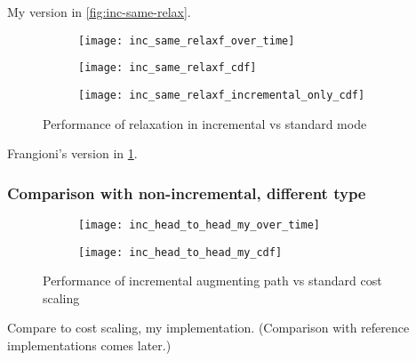 My version in \cref{fig:inc-same-relax}.

\begin{figure}
    \centering
    \begin{subfigure}[c]{0.9\textwidth}
        \texttt{[image: inc\_same\_relaxf\_over\_time]}
    \end{subfigure}
    \begin{subfigure}[c]{0.45\textwidth}
        \texttt{[image: inc\_same\_relaxf\_cdf]}
    \end{subfigure}
    \begin{subfigure}[c]{0.45\textwidth}
        \texttt{[image: inc\_same\_relaxf\_incremental\_only\_cdf]}
    \end{subfigure}
    \caption{Performance of relaxation in incremental vs standard mode}
    \label{fig:inc-same-relaxf}
\end{figure}

Frangioni's version in \cref{fig:inc-same-relaxf}. 

\subsubsection{Comparison with non-incremental, different type}

\begin{figure}
    \centering
    \begin{subfigure}[c]{0.45\textwidth}
        \texttt{[image: inc\_head\_to\_head\_my\_over\_time]}
    \end{subfigure}
    \begin{subfigure}[c]{0.45\textwidth}
        \texttt{[image: inc\_head\_to\_head\_my\_cdf]}
    \end{subfigure}
    \caption{Performance of incremental augmenting path vs standard cost scaling}
    \label{fig:inc-head-to-head-my}
\end{figure}

Compare to cost scaling, my implementation. (Comparison with reference implementations comes later.) 

